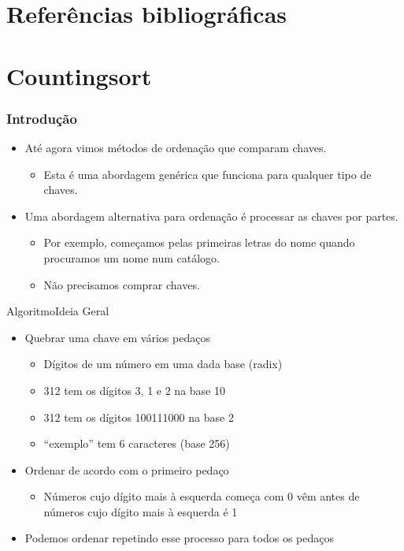 \documentclass[aspectratio=169]{beamer}
\begin{document}

\section{Referências bibliográficas}

\section{Countingsort} %

\begin{frame}
\frametitle{Introdução}
\begin{itemize}
\item Até agora vimos métodos de ordenação que comparam chaves.
\begin{itemize}
\item Esta é uma abordagem genérica que funciona para qualquer tipo de chaves.
\end{itemize}
\item Uma abordagem alternativa para ordenação é processar as chaves por partes.
\begin{itemize}
\item Por exemplo, começamos pelas primeiras letras do nome quando procuramos um nome num catálogo.
\item Não precisamos comprar chaves.
\end{itemize}
\end{itemize}
\end{frame}

\begin{frame}{Algoritmo}{Ideia Geral}
\begin{itemize}
\item Quebrar uma chave em vários pedaços
\begin{itemize}
\item Dígitos de um número em uma dada base (radix)
\item 312 tem os dígitos 3, 1 e 2 na base 10
\item 312 tem os dígitos 100111000 na base 2
\item ``exemplo'' tem 6 caracteres (base 256)
\end{itemize}
\item Ordenar de acordo com o primeiro pedaço
\begin{itemize}
\item Números cujo dígito mais à esquerda começa com 0 vêm antes de números cujo dígito mais à esquerda é 1
\end{itemize}
\item Podemos ordenar repetindo esse processo para todos os pedaços
\end{itemize}
\end{frame}
\end{document}
